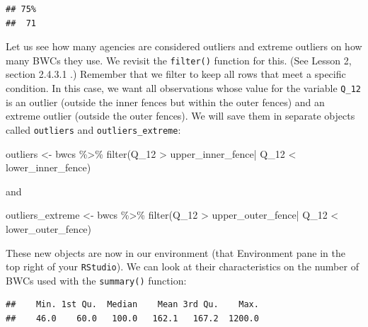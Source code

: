\documentclass[
]{book}
\newenvironment{Shaded}{\begin{snugshade}}{\end{snugshade}}
\newcommand{\FunctionTok}[1]{\textcolor[rgb]{0.00,0.00,0.00}{#1}}
\newcommand{\NormalTok}[1]{#1}
\newcommand{\OtherTok}[1]{\textcolor[rgb]{0.56,0.35,0.01}{#1}}
\newcommand{\SpecialCharTok}[1]{\textcolor[rgb]{0.00,0.00,0.00}{#1}}
\begin{document}
\begin{verbatim}
## 75% 
##  71
\end{verbatim}

Let us see how many agencies are considered outliers and extreme outliers on how many BWCs they use. We revisit the \texttt{filter()} function for this. (See Lesson 2, section 2.4.3.1 .) Remember that we filter to keep all rows that meet a specific condition. In this case, we want all observations whose value for the variable \texttt{Q\_12} is an outlier (outside the inner fences but within the outer fences) and an extreme outlier (outside the outer fences). We will save them in separate objects called \texttt{outliers} and \texttt{outliers\_extreme}:

\begin{Shaded}
\begin{Highlighting}[]
\NormalTok{outliers }\OtherTok{\textless{}{-}}\NormalTok{ bwcs }\SpecialCharTok{\%\textgreater{}\%} 
  \FunctionTok{filter}\NormalTok{(Q\_12 }\SpecialCharTok{\textgreater{}}\NormalTok{ upper\_inner\_fence}\SpecialCharTok{|}\NormalTok{ Q\_12 }\SpecialCharTok{\textless{}}\NormalTok{ lower\_inner\_fence) }
\end{Highlighting}
\end{Shaded}

and

\begin{Shaded}
\begin{Highlighting}[]
\NormalTok{outliers\_extreme }\OtherTok{\textless{}{-}}\NormalTok{ bwcs }\SpecialCharTok{\%\textgreater{}\%} 
  \FunctionTok{filter}\NormalTok{(Q\_12 }\SpecialCharTok{\textgreater{}}\NormalTok{ upper\_outer\_fence}\SpecialCharTok{|}\NormalTok{ Q\_12 }\SpecialCharTok{\textless{}}\NormalTok{ lower\_outer\_fence)}
\end{Highlighting}
\end{Shaded}

These new objects are now in our environment (that Environment pane in the top right of your \texttt{RStudio}). We can look at their characteristics on the number of BWCs used with the \texttt{summary()} function:

\begin{Shaded}
\end{Shaded}

\begin{verbatim}
##    Min. 1st Qu.  Median    Mean 3rd Qu.    Max. 
##    46.0    60.0   100.0   162.1   167.2  1200.0
\end{verbatim}
\end{document}
